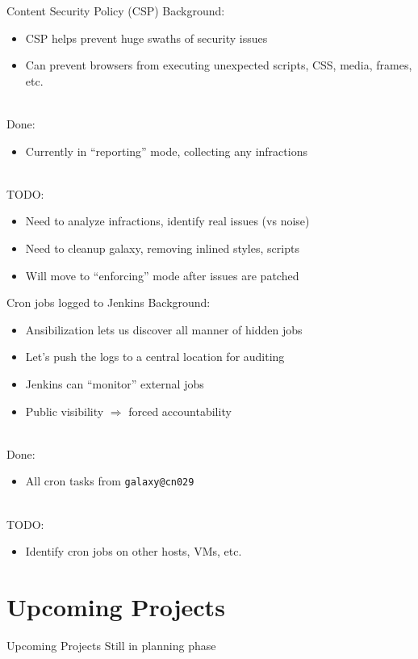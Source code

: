 \documentclass[12pt]{ufrslides}
\begin{document}
	\begin{frame}{Content Security Policy (CSP)}
		Background:
		\begin{itemize}
			\item CSP helps prevent huge swaths of security issues
			\item Can prevent browsers from executing unexpected scripts, CSS, media, frames, etc.
		\end{itemize}
		\ \\[0.5cm]
		Done:
		\begin{itemize}
			\item Currently in ``reporting'' mode, collecting any infractions
		\end{itemize}
		\ \\[0.5cm]
		TODO:
		\begin{itemize}
			\item Need to analyze infractions, identify real issues (vs noise)
			\item Need to cleanup galaxy, removing inlined styles, scripts
			\item Will move to ``enforcing'' mode after issues are patched
		\end{itemize}
	\end{frame}

	\begin{frame}{Cron jobs logged to Jenkins}
		Background:
		\begin{itemize}
			\item Ansibilization lets us discover all manner of hidden jobs
			\item Let's push the logs to a central location for auditing
			\item Jenkins can ``monitor'' external jobs
			\item Public visibility $\Rightarrow$ forced accountability
		\end{itemize}
		\ \\[0.5cm]
		Done:
		\begin{itemize}
			\item All cron tasks from \texttt{galaxy@cn029}
		\end{itemize}
		\ \\[0.5cm]
		TODO:
		\begin{itemize}
			\item Identify cron jobs on other hosts, VMs, etc.
		\end{itemize}
	\end{frame}


\section[Upcoming]{Upcoming Projects}
\begin{frame}{Upcoming Projects}
	Still in planning phase
\end{frame}
\end{document}
